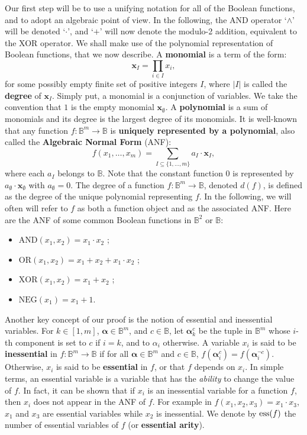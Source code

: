 Our first step will be to use a unifying notation for all of the Boolean
functions, and to adopt an algebraic point of view.  In the following, the AND
operator `$\wedge$' will be denoted `$\cdot$', and `$+$' will now denote the
modulo-2 addition, equivalent to the XOR operator.  We shall make use of the
polynomial representation of Boolean functions, that we now describe. A
\textbf{ monomial} is a term of the form:
$$\mathbf{x}_I=\underset{i\in I}{\prod}x_i,$$ for some possibly empty finite
set of positive integers $I$, where $|I|$ is called the \textbf{degree} of
$\mathbf{x}_I$. Simply put, a monomial is a conjunction of variables. We take
the convention that $1$ is the empty monomial $\mathbf{x}_\emptyset $. A
\textbf{ polynomial} is a sum of monomials and its degree is the largest degree
of its monomials.  It is well-known \cite{StoneAlgebra36,ZhegalkinAlgebra27}
that any function $f:\mathbb{B}^m\rightarrow \mathbb{B}$ is \textbf{uniquely
represented by a polynomial}, also called the \textbf{Algebraic Normal Form}
(ANF): $$f(x_1,\ldots,x_m)=\sum_{I\subseteq \{1,\ldots,m\}}a_I\cdot
\mathbf{x}_I,$$ where each $a_I$ belongs to $\mathbb{B}$. Note that the
constant function $0$ is represented by $a_\emptyset\cdot \mathbf{x}_\emptyset$
with $a_\emptyset =0$. The degree of a function $f:\mathbb{B}^m\rightarrow
\mathbb{B}$, denoted $d(f)$, is defined as the degree of the unique polynomial
representing $f$. In the following, we will often will refer to $f$ as both a
function object and as the associated ANF. Here are the ANF of some common
Boolean functions in $\mathbb{B}^2$ or $\mathbb{B}$:

\begin{itemize}
  \item $\text{AND}(x_1, x_2) = x_1 \cdot x_2$ ;
  \item $\text{OR}(x_1, x_2) = x_1 + x_2 + x_1 \cdot x_2$ ;
  \item $\text{XOR}(x_1, x_2) = x_1 + x_2$ ;
  \item $\text{NEG}(x_1) = x_1 + 1$.
\end{itemize}

Another key concept of our proof is the notion of essential and inessential
variables.  For $k\in [1,m]$, $\boldsymbol{\alpha}\in \mathbb{B}^m$, and $c \in
\mathbb{B}$, let ${\boldsymbol{\alpha}}_{k}^c$ be the tuple in $\mathbb{B}^{m}$
whose $i$-th component is set to $c$ if $i=k$, and to $\alpha_i$ otherwise.  A
variable $x_i$ is said to be \textbf{inessential} in $f\colon \mathbb{B}^m\to
\mathbb{B}$ if for all $\boldsymbol{\alpha} \in \mathbb{B}^m$ and $c \in
\mathbb{B}$, $f(\boldsymbol{\alpha}^c_i) = f(\boldsymbol{\alpha}^{\neg c}_i)$.
Otherwise, $x_i$ is said to be \textbf{essential} in $f$, or that $f$ depends
on $x_i$. In simple terms, an essential variable is a variable that has the
\textit{ability} to change the value of $f$. In fact, it can be shown that if
$x_i$ is an inessential variable for a function $f$, then $x_i$ does not appear
in the ANF of $f$.  For example in $f(x_1, x_2, x_3) = x_1 \cdot x_3$, $x_1$
and $x_3$ are essential variables while $x_2$ is inessential.  We denote by
$\operatorname{ess}(f)$ the number of essential variables of $f$ (or \textbf{essential
arity}).

